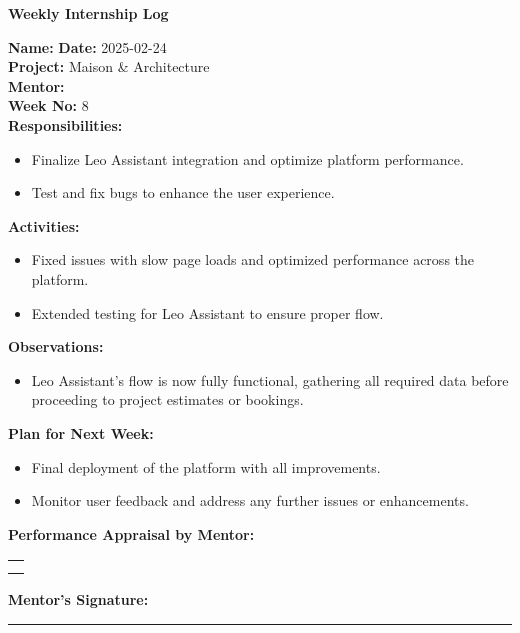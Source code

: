 \begin{center}
    \bfseries Weekly Internship Log
\end{center}

\noindent
\textbf{Name:}  \hfill \textbf{Date:} 2025-02-24 \\
\textbf{Project:} Maison \& Architecture \hfill \\
\textbf{Mentor:}  \\
\textbf{Week No:} 8 \\

\noindent
\textbf{Responsibilities:}
\begin{itemize}
    \item Finalize Leo Assistant integration and optimize platform performance.
    \item Test and fix bugs to enhance the user experience.
\end{itemize}

\noindent
\textbf{Activities:}
\begin{itemize}
    \item Fixed issues with slow page loads and optimized performance across the platform.
    \item Extended testing for Leo Assistant to ensure proper flow.
\end{itemize}

\noindent
\textbf{Observations:}
\begin{itemize}
    \item Leo Assistant’s flow is now fully functional, gathering all required data before proceeding to project estimates or bookings.
\end{itemize}

\noindent
\textbf{Plan for Next Week:}
\begin{itemize}
    \item Final deployment of the platform with all improvements.
    \item Monitor user feedback and address any further issues or enhancements.
\end{itemize}

\noindent
\textbf{Performance Appraisal by Mentor:} \\
\begin{table}[h]
    \centering
    \noindent
    \begin{tabularx}{\textwidth} { 
        | >{\centering\arraybackslash}X| }

        \hline
        \\ \\
        \hline
    \end{tabularx}
\end{table}

\vspace{2em}
\noindent
\textbf{Mentor’s Signature:} \\
\rule{0.4\textwidth}{0.5pt}